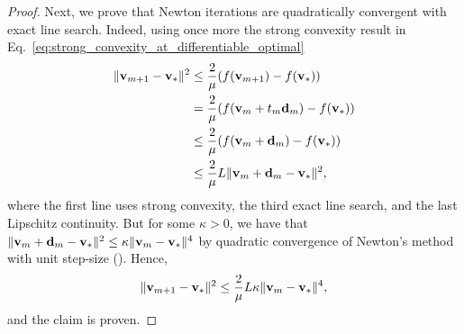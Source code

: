 \begin{theorem}
\begin{proof}
    Next, we prove that Newton iterations are quadratically convergent
  with exact line search. Indeed, using once more the strong convexity result in Eq.~\eqref{eq:strong_convexity_at_differentiable_optimal}
  \begin{align*}
    \|{\mathbf{v}}_{m+1} - {\mathbf{v}}_*\|^2&\le \frac{2}{\mu} ( f({\mathbf{v}}_{m+1}) - f({\mathbf{v}}_*)) \\
                    &= \frac{2}{\mu} ( f({\mathbf{v}}_m + t_m {\mathbf{d}}_m   ) - f({\mathbf{v}}_*)) \\
                    &\le \frac{2}{\mu} ( f({\mathbf{v}}_m + {\mathbf{d}}_m   ) - f({\mathbf{v}}_*)) \\
                    &\le \frac{2}{\mu} L \|{\mathbf{v}}_m + {\mathbf{d}}_m - {\mathbf{v}}_*\|^2,
  \end{align*}
    where the first line uses strong convexity,
    the third exact line search, and the last
    Lipschitz continuity. But for some $\kappa > 0$,
    we have that $\|{\mathbf{v}}_m + {\mathbf{d}}_m - {\mathbf{v}}_*\|^2 \le \kappa \|{\mathbf{v}}_{m} - {\mathbf{v}}_*\|^4$
    by quadratic convergence of Newton's method with unit step-size (\cite[Theorem 3.5]{bib:nocedal2006numerical}).
    Hence,
    \[
      \|{\mathbf{v}}_{m+1} - {\mathbf{v}}_*\|^2 \le \frac{2}{\mu}  L \kappa \|{\mathbf{v}}_{m} - {\mathbf{v}}_*\|^4,
    \]
    and the claim is proven.
  \end{proof}
\end{theorem}
